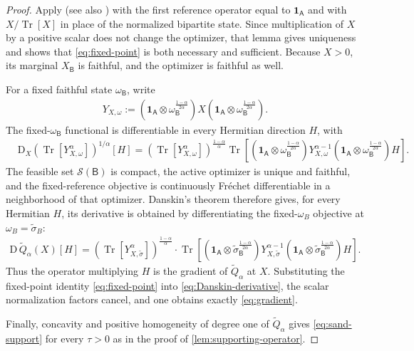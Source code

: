 \documentclass[11pt,reqno]{amsart}
\theoremstyle{definition}
\DeclareMathOperator{\Tr}{Tr}
\newcommand{\I}{\mathbf 1}
\newcommand{\A}{\mathsf{A}}
\newcommand{\B}{\mathsf{B}}
\newcommand{\states}[1]{\mathcal{S}(#1)}
\newcommand{\sand}{\widetilde}
\begin{document}
\begin{proof}
Apply \cite[Lemma~5]{HT14} (see also \cite{rubboli2026quantum}) with the first reference operator equal to
$\I_{\A}$ and with $X/\Tr [X]$ in place of the normalized bipartite state.
Since multiplication of $X$ by a positive scalar does not change the
optimizer, that lemma gives uniqueness and shows that
\cref{eq:fixed-point} is both necessary and sufficient.  Because $X>0$,
its marginal $X_{\B}$ is faithful, and the optimizer is faithful as well.

For a fixed faithful state $\omega_{\B}$, write
\begin{align}
 Y_{X,\omega}
 :=
 (\I_{\A}\otimes
 \omega_{\B}^{\frac{1-\alpha}{2\alpha}})
 X
 (\I_{\A}\otimes
 \omega_{\B}^{\frac{1-\alpha}{2\alpha}}).
\end{align}
The fixed-$\omega_{\B}$ functional is differentiable in every Hermitian
direction $H$, with
\begin{align}
 &\mathrm D_X
 \left(\Tr[Y_{X,\omega}^{\alpha}]\right)^{1/\alpha}[H]
 =
 \left(\Tr[Y_{X,\omega}^{\alpha}]\right)^{
 \frac{1-\alpha}{\alpha}}
 \Tr\!\left[
 (\I_{\A}\otimes
 \omega_{\B}^{\frac{1-\alpha}{2\alpha}})
 Y_{X,\omega}^{\alpha-1}
 (\I_{\A}\otimes
 \omega_{\B}^{\frac{1-\alpha}{2\alpha}})
 H
 \right].
 \label{eq:fixed-reference-derivative}
\end{align}
The feasible set $\states{\B}$ is compact, the active optimizer is
unique and faithful, and the fixed-reference objective is continuously
Fr\'echet differentiable in a neighborhood of that optimizer.
Danskin's theorem \cite{Danskin1967} therefore gives, for every Hermitian $H$, its derivative is obtained by differentiating the fixed-\(\omega_B\) objective at \(\omega_B=\widetilde{\sigma}_B\):
\begin{align}
 \mathrm D\,\sand Q_\alpha(X)[H]
 =
 \left(\Tr[Y_{X,\sand\sigma}^{\alpha}]\right)^{
 \frac{1-\alpha}{\alpha}}
 \cdot
 \Tr\!\left[
 (\I_{\A}\otimes
 \sand\sigma_{\B}^{\frac{1-\alpha}{2\alpha}})
 Y_{X,\sand\sigma}^{\alpha-1}
 (\I_{\A}\otimes
 \sand\sigma_{\B}^{\frac{1-\alpha}{2\alpha}})
 H
 \right].
 \label{eq:Danskin-derivative}
\end{align}
Thus the operator multiplying $H$ is the gradient of
$\sand Q_\alpha$ at $X$.  Substituting the fixed-point identity
\cref{eq:fixed-point} into \cref{eq:Danskin-derivative}, the scalar
normalization factors cancel, and one obtains exactly
\cref{eq:gradient}.

Finally, concavity and positive homogeneity of degree one of $\sand Q_\alpha$ gives \cref{eq:sand-support}
for every $\tau>0$ as in the proof of \cref{lem:supporting-operator}.
\end{proof}
\end{document}

